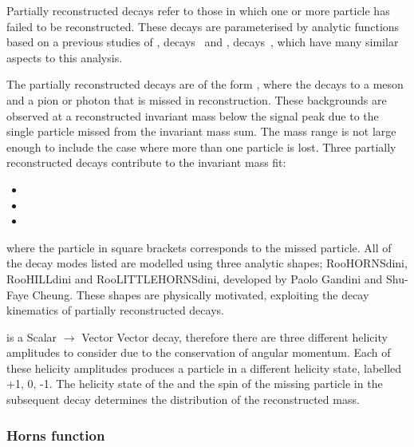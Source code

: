 Partially reconstructed decays refer to those in which one or more particle has failed to be reconstructed. These decays are parameterised by analytic functions based on a previous studies of \decay{\Bm}{\D\Km},  decays~\cite{LHCb-PAPER-2016-003} and \decay{\Bz}{\D\Kstarz},  decays~\cite{LHCb-PAPER-2016-006}, which have many similar aspects to this analysis.

The partially reconstructed decays are of the form \decay{\B}{\Dstar\Kstar}, where the \Dstar decays to a \Dz meson and a pion or photon that is missed in reconstruction. These backgrounds are observed at a reconstructed invariant mass below the signal peak due to the single particle missed from the invariant mass sum. The \Bm mass range is not large enough to include the case where more than one particle is lost. Three partially reconstructed decays contribute to the invariant mass fit:

\begin{itemize}
\item{\decay{\Bm}{(\decay{\Dstarz}{\Dz[\piz]})\Kstarm}}
\item{\decay{\Bm}{(\decay{\Dstarz}{\Dz[\gamma]})\Kstarm}}
\item{\decay{\Bd}{(\decay{\Dstarp}{\Dz[\pip]})\Kstarm}}
\end{itemize}

where the particle in square brackets corresponds to the missed particle. All of the decay modes listed are modelled using three analytic shapes; RooHORNSdini, RooHILLdini and RooLITTLEHORNSdini, developed by Paolo Gandini and Shu-Faye Cheung. These shapes are physically motivated, exploiting the decay kinematics of partially reconstructed decays.

\decay{\B}{\Dstar\Kstar} is a Scalar $\to$ Vector Vector decay, therefore there are three different helicity amplitudes to consider due to the conservation of angular momentum. Each of these helicity amplitudes produces a \Dstar particle in a different helicity state, labelled +1, 0, -1. The helicity state of the \Dstar and the spin of the missing particle in the subsequent \Dstar decay determines the distribution of the reconstructed \B mass. 

\subsubsection{Horns function}

